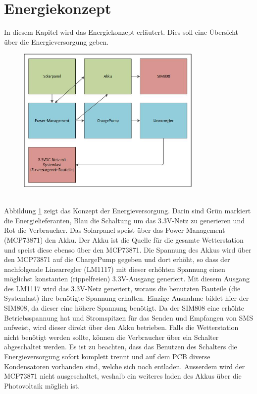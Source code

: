 \section{Energiekonzept}
In diesem Kapitel wird das Energiekonzept erläutert. Dies soll eine Übersicht über die Energieversorgung geben.\\
\begin{figure}[hbtp]
\centering
\includegraphics[width=0.8\textwidth]{graphics/Energieversorgung/Konzept.JPG}
\label{fig:Energiekonzept}
\end{figure}\\
\newpage
Abbildung \ref{fig:Energiekonzept} zeigt das Konzept der Energieversorgung. Darin sind Grün markiert die Energielieferanten, Blau die Schaltung um das 3.3V-Netz zu generieren und Rot die Verbraucher. Das Solarpanel speist über das Power-Management (MCP73871) den Akku. Der Akku ist die Quelle für die gesamte Wetterstation und speist diese ebenso über den MCP73871. Die Spannung des Akkus wird über den MCP73871 auf die ChargePump gegeben und dort erhöht, so dass der nachfolgende Linearregler (LM1117) mit dieser erhöhten Spannung einen möglichst konstanten (rippelfreien) 3.3V-Ausgang generiert. Mit diesem Ausgang des LM1117 wird das 3.3V-Netz generiert, woraus die benutzten Bauteile (die Systemlast) ihre benötigte Spannung erhalten. Einzige Ausnahme bildet hier der SIM808, da dieser eine höhere Spannung benötigt. Da der SIM808 eine erhöhte Betriebsspannung hat und Stromspitzen für das Senden und Empfangen von SMS aufweist, wird dieser direkt über den Akku betrieben. Falls die Wetterstation nicht benötigt werden sollte, können die Verbraucher über ein Schalter abgeschaltet werden. Es ist zu beachten, dass das Benutzen des Schalters die Energieversorgung sofort komplett trennt und auf dem PCB diverse Kondensatoren vorhanden sind, welche sich noch entladen. Ausserdem wird der MCP73871 nicht ausgeschaltet, weshalb ein weiteres laden des Akkus über die Photovoltaik möglich ist.
